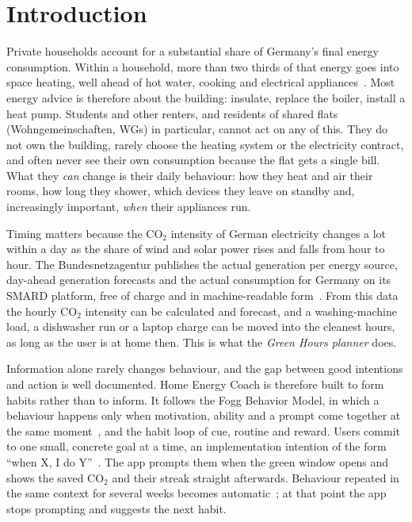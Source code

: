 \documentclass[conference]{IEEEtran}
\newcommand{\COtwo}{CO$_2$}
\begin{document}
\section{Introduction}
Private households account for a substantial share of Germany's final energy consumption. Within a household, more than two thirds of that energy goes into space heating, well ahead of hot water, cooking and electrical appliances~\cite{uba-haushalte}. Most energy advice is therefore about the building: insulate, replace the boiler, install a heat pump. Students and other renters, and residents of shared flats (Wohngemeinschaften, WGs) in particular, cannot act on any of this. They do not own the building, rarely choose the heating system or the electricity contract, and often never see their own consumption because the flat gets a single bill. What they \emph{can} change is their daily behaviour: how they heat and air their rooms, how long they shower, which devices they leave on standby and, increasingly important, \emph{when} their appliances run.

Timing matters because the \COtwo{} intensity of German electricity changes a lot within a day as the share of wind and solar power rises and falls from hour to hour. The Bundesnetzagentur publishes the actual generation per energy source, day-ahead generation forecasts and the actual consumption for Germany on its SMARD platform, free of charge and in machine-readable form~\cite{smard}. From this data the hourly \COtwo{} intensity can be calculated and forecast, and a washing-machine load, a dishwasher run or a laptop charge can be moved into the cleanest hours, as long as the user is at home then. This is what the \emph{Green Hours planner} does.

Information alone rarely changes behaviour, and the gap between good intentions and action is well documented. Home Energy Coach is therefore built to form habits rather than to inform. It follows the Fogg Behavior Model, in which a behaviour happens only when motivation, ability and a prompt come together at the same moment~\cite{fogg2009}, and the habit loop of cue, routine and reward. Users commit to one small, concrete goal at a time, an implementation intention of the form ``when X, I do Y''~\cite{gollwitzer1999}. The app prompts them when the green window opens and shows the saved \COtwo{} and their streak straight afterwards. Behaviour repeated in the same context for several weeks becomes automatic~\cite{lally2010}; at that point the app stops prompting and suggests the next habit.
\end{document}

